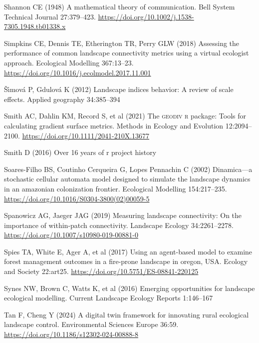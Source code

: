 \documentclass[
  10pt,
  a4paperpaper,
]{article}
\newlength{\cslhangindent}
\newenvironment{CSLReferences}[2] %
 {\begin{list}{}{%
  \setlength{\itemindent}{0pt}
  \setlength{\leftmargin}{0pt}
  \setlength{\parsep}{0pt}
  \ifodd #1
   \setlength{\leftmargin}{\cslhangindent}
   \setlength{\itemindent}{-1\cslhangindent}
  \fi
  \setlength{\itemsep}{#2\baselineskip}}}
 {\end{list}}
\begin{document}
\begin{CSLReferences}{1}{1}
Shannon CE (1948) A mathematical theory of communication. Bell System
Technical Journal 27:379--423.
\url{https://doi.org/10.1002/j.1538-7305.1948.tb01338.x}

Simpkins CE, Dennis TE, Etherington TR, Perry GLW (2018) Assessing the
performance of common landscape connectivity metrics using a virtual
ecologist approach. Ecological Modelling 367:13--23.
\url{https://doi.org/10.1016/j.ecolmodel.2017.11.001}

Šı́mová P, Gdulová K (2012) Landscape indices behavior: A review of scale
effects. Applied geography 34:385--394

Smith AC, Dahlin KM, Record S, et al (2021) The {\textsc{geodiv r}}
package: Tools for calculating gradient surface metrics. Methods in
Ecology and Evolution 12:2094--2100.
\url{https://doi.org/10.1111/2041-210X.13677}

Smith D (2016) Over 16 years of r project history

Soares-Filho BS, Coutinho Cerqueira G, Lopes Pennachin C (2002)
Dinamica---a stochastic cellular automata model designed to simulate the
landscape dynamics in an amazonian colonization frontier. Ecological
Modelling 154:217--235.
\url{https://doi.org/10.1016/S0304-3800(02)00059-5}

Spanowicz AG, Jaeger JAG (2019) Measuring landscape connectivity: On the
importance of within-patch connectivity. Landscape Ecology
34:2261--2278. \url{https://doi.org/10.1007/s10980-019-00881-0}

Spies TA, White E, Ager A, et al (2017) Using an agent-based model to
examine forest management outcomes in a fire-prone landscape in oregon,
USA. Ecology and Society 22:art25.
\url{https://doi.org/10.5751/ES-08841-220125}

Synes NW, Brown C, Watts K, et al (2016) Emerging opportunities for
landscape ecological modelling. Current Landscape Ecology Reports
1:146--167

Tan F, Cheng Y (2024) A digital twin framework for innovating rural
ecological landscape control. Environmental Sciences Europe 36:59.
\url{https://doi.org/10.1186/s12302-024-00888-8}


\end{CSLReferences}
\end{document}

